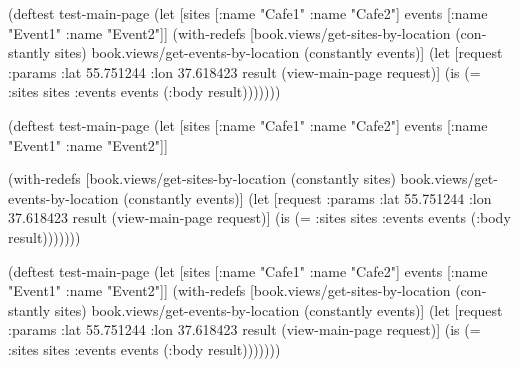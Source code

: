 \ifnarrow

\begin{english}
  \begin{clojure}
(deftest test-main-page
  (let [sites [{:name "Cafe1"}
               {:name "Cafe2"}]
        events [{:name "Event1"}
                {:name "Event2"}]]
    (with-redefs
      [book.views/get-sites-by-location
       (constantly sites)
       book.views/get-events-by-location
       (constantly events)]
      (let [request
            {:params {:lat 55.751244
                      :lon 37.618423}}
            result
            (view-main-page request)]
        (is (= {:sites sites
               :events events}
               (:body result)))))))
  \end{clojure}
\end{english}

\else

\ifafive

\begin{english}
  \begin{clojure}
(deftest test-main-page
  (let [sites [{:name "Cafe1"} {:name "Cafe2"}]
        events [{:name "Event1"} {:name "Event2"}]]
  \end{clojure}
\end{english}

\pagebreakafive

\begin{english}
  \begin{clojure}
    (with-redefs
      [book.views/get-sites-by-location
         (constantly sites)
       book.views/get-events-by-location
         (constantly events)]
      (let [request {:params {:lat 55.751244
                              :lon 37.618423}}
            result (view-main-page request)]
        (is (= {:sites sites :events events}
               (:body result)))))))
  \end{clojure}
\end{english}

\else

\begin{english}
  \begin{clojure}
(deftest test-main-page
  (let [sites [{:name "Cafe1"} {:name "Cafe2"}]
        events [{:name "Event1"} {:name "Event2"}]]
    (with-redefs
      [book.views/get-sites-by-location
         (constantly sites)
       book.views/get-events-by-location
         (constantly events)]
      (let [request {:params {:lat 55.751244
                              :lon 37.618423}}
            result (view-main-page request)]
        (is (= {:sites sites :events events}
               (:body result)))))))
  \end{clojure}
\end{english}

